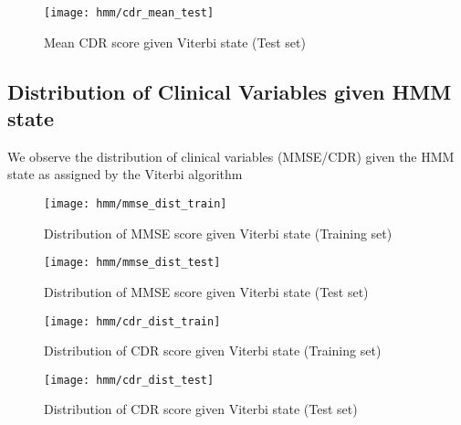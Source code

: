 \documentclass[12pt,a4paper]{article}
\begin{document}
\begin{figure}[H]
  \centering
  \texttt{[image: hmm/cdr\_mean\_test]}
  \caption{Mean CDR score given Viterbi state (Test set)}  
\end{figure}

\subsection{Distribution of Clinical Variables given HMM state}
\label{sec:dist-heatmap}

We observe the distribution of clinical variables (MMSE/CDR) given the
HMM state as assigned by the Viterbi algorithm

\begin{figure}[H]
  \centering
  \texttt{[image: hmm/mmse\_dist\_train]}
  \caption{Distribution of MMSE score given Viterbi state (Training set)}  
\end{figure}

\begin{figure}[H]
  \centering
  \texttt{[image: hmm/mmse\_dist\_test]}
  \caption{Distribution of MMSE score given Viterbi state (Test set)}  
\end{figure}

\begin{figure}[H]
  \centering
  \texttt{[image: hmm/cdr\_dist\_train]}
  \caption{Distribution of CDR score given Viterbi state (Training set)}  
\end{figure}

\begin{figure}[H]
  \centering
  \texttt{[image: hmm/cdr\_dist\_test]}
  \caption{Distribution of CDR score given Viterbi state (Test set)}  
\end{figure}
\end{document}

